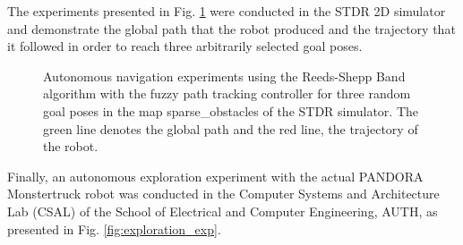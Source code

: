 \documentclass[conference]{IEEEtran}
\begin{document}
The experiments presented in Fig. \ref{fig:rsband_exp} were conducted in the STDR 2D simulator and demonstrate the global path that the robot produced and the trajectory that it followed in order to reach three arbitrarily selected goal poses.

\begin{figure}[!ht]
	\centering
	\caption{Autonomous navigation experiments using the Reeds-Shepp Band algorithm with the fuzzy path tracking controller for three random goal poses in the map sparse\_obstacles of the STDR simulator. The green line denotes the global path and the red line, the trajectory of the robot.}
	\label{fig:rsband_exp}
\end{figure}

Finally, an autonomous exploration experiment with the actual PANDORA Monstertruck robot was conducted in the Computer Systems and Architecture Lab (CSAL) of the School of Electrical and Computer Engineering, AUTH, as presented in Fig. \ref{fig:exploration_exp}.
\end{document}
